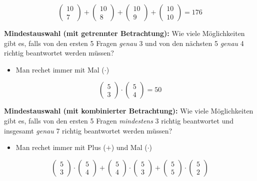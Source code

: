 $$
\begin{pmatrix}10\\7\end{pmatrix} + \begin{pmatrix}10\\8\end{pmatrix} + \begin{pmatrix}10\\9\end{pmatrix} + \begin{pmatrix}10\\10\end{pmatrix} = 176
$$

\textbf{Mindestauswahl (mit getrennter Betrachtung):} Wie viele Möglichkeiten gibt es, falls von den ersten 5 Fragen \textit{genau} 3 und von den nächsten 5 \textit{genau} 4 richtig beantwortet werden müssen?

\begin{itemize}[leftmargin=*]
\item Man rechet immer mit Mal ($\cdot$)
\end{itemize}

$$
\begin{pmatrix}5\\3\end{pmatrix} \cdot \begin{pmatrix}5\\4\end{pmatrix} = 50
$$

\textbf{Mindestauswahl (mit kombinierter Betrachtung):} Wie viele Möglichkeiten gibt es, falls von den ersten 5 Fragen \textit{mindestens} 3 richtig beantwortet und insgesamt \textit{genau} 7 richtig beantwortet werden müssen?

\begin{itemize}[leftmargin=*]
\item Man rechet immer mit Plus ($+$) und Mal ($\cdot$)
\end{itemize}


$$
\begin{pmatrix}5\\3\end{pmatrix} \cdot \begin{pmatrix}5\\4\end{pmatrix} + \begin{pmatrix}5\\4\end{pmatrix} \cdot \begin{pmatrix}5\\3\end{pmatrix} +
\begin{pmatrix}5\\5\end{pmatrix} \cdot \begin{pmatrix}5\\2\end{pmatrix}
$$